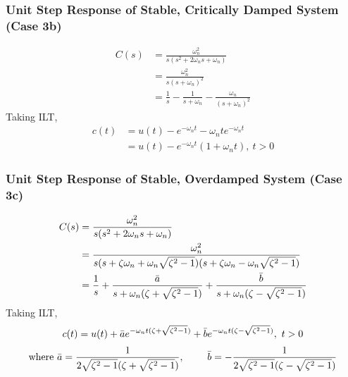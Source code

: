 \documentclass[a4paper]{article}
\begin{document}
\subsubsection{Unit Step Response of Stable, Critically Damped System (Case 3b)}
\begin{align*}
    C(s) &= \frac{\omega_n^2}{s(s^2+2\omega_n s+\omega_n)}\\
    &= \frac{\omega_n^2}{s(s+\omega_n)^2}\\
    &= \frac{1}{s}-\frac{1}{s+\omega_n}-\frac{\omega_n}{(s+\omega_n)^2}
\end{align*}
Taking ILT,
\begin{align*}
    c(t) &= u(t)-e^{-\omega_n t}-\omega_n te^{-\omega_n t}\\
    &= u(t) - e^{-\omega_n t}(1+\omega_n t),\ t>0
\end{align*}

\subsubsection{Unit Step Response of Stable, Overdamped System (Case 3c)}
\begin{align*}
    C(s) &= \frac{\omega_n^2}{s(s^2+2\omega_n s+\omega_n)}\\
    &= \frac{\omega_n^2}{s(s+\zeta\omega_n+\omega_n\sqrt{\zeta^2-1})(s+\zeta\omega_n-\omega_n\sqrt{\zeta^2-1})}\\
    &= \frac{1}{s}+\frac{\Bar{a}}{s+\omega_n(\zeta+\sqrt{\zeta^2-1})}+\frac{\Bar{b}}{s+\omega_n(\zeta-\sqrt{\zeta^2-1})}
\end{align*}
Taking ILT,
\begin{align*}
    c(t) = u(t)+\Bar{a}e^{-\omega_n t(\zeta+\sqrt{\zeta^2-1})}+\Bar{b}e^{-\omega_n t(\zeta-\sqrt{\zeta^2-1})},\ t>0
\end{align*}
$$\text{where }\Bar{a}=\frac{1}{2\sqrt{\zeta^2-1}(\zeta+\sqrt{\zeta^2-1})},\ \qquad\Bar{b}=-\frac{1}{2\sqrt{\zeta^2-1}(\zeta-\sqrt{\zeta^2-1})}$$
\end{document}
